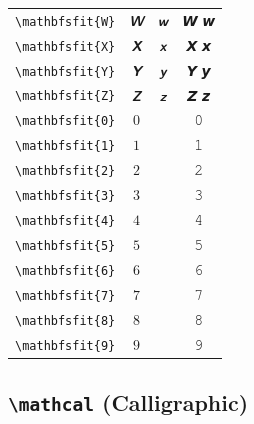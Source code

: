 \documentclass[12pt,a4paper]{article}
\begin{document}
\begin{longtable}{|c|c|c|c|}
\verb|\mathbfsfit{W}| & $\mathbfsfit{W}$ & $\mathbfsfit{w}$ & 𝙒 𝙬 \\
\verb|\mathbfsfit{X}| & $\mathbfsfit{X}$ & $\mathbfsfit{x}$ & 𝙓 𝙭 \\
\verb|\mathbfsfit{Y}| & $\mathbfsfit{Y}$ & $\mathbfsfit{y}$ & 𝙔 𝙮 \\
\verb|\mathbfsfit{Z}| & $\mathbfsfit{Z}$ & $\mathbfsfit{z}$ & 𝙕 𝙯 \\
\verb|\mathbfsfit{0}| & $\mathbfsfit{0}$ & & 𝟶 \\
\verb|\mathbfsfit{1}| & $\mathbfsfit{1}$ & & 𝟷 \\
\verb|\mathbfsfit{2}| & $\mathbfsfit{2}$ & & 𝟸 \\
\verb|\mathbfsfit{3}| & $\mathbfsfit{3}$ & & 𝟹 \\
\verb|\mathbfsfit{4}| & $\mathbfsfit{4}$ & & 𝟺 \\
\verb|\mathbfsfit{5}| & $\mathbfsfit{5}$ & & 𝟻 \\
\verb|\mathbfsfit{6}| & $\mathbfsfit{6}$ & & 𝟼 \\
\verb|\mathbfsfit{7}| & $\mathbfsfit{7}$ & & 𝟽 \\
\verb|\mathbfsfit{8}| & $\mathbfsfit{8}$ & & 𝟾 \\
\verb|\mathbfsfit{9}| & $\mathbfsfit{9}$ & & 𝟿 \\
\hline
\end{longtable}

\newpage

\subsection*{\texttt{\textbackslash{}mathcal} (Calligraphic)}
\end{document}
